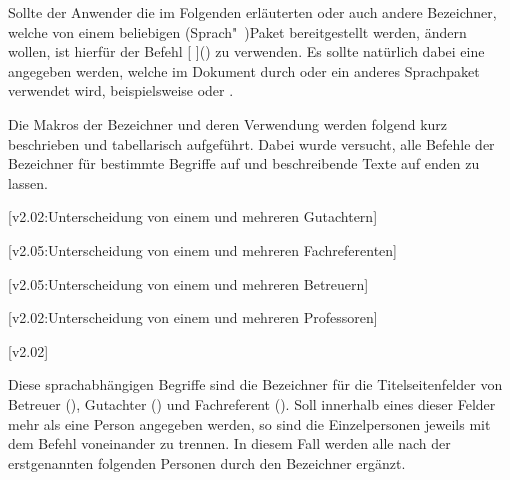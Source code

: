 \begin{DeclareEntity*}{}
\begin{DeclareEntity*}{}
\begin{DeclareEntity*}{}
Sollte der Anwender die im Folgenden erläuterten oder auch andere Bezeichner, 
welche von einem beliebigen (Sprach"~)Paket bereitgestellt werden, ändern 
wollen, ist hierfür der Befehl
[%
]()
zu verwenden. Es sollte natürlich dabei eine  angegeben werden, 
welche im Dokument durch  oder ein anderes Sprachpaket verwendet 
wird, beispielsweise  oder . 

Die Makros der Bezeichner und deren Verwendung werden folgend kurz beschrieben 
und tabellarisch aufgeführt. Dabei wurde versucht, alle Befehle der Bezeichner 
für bestimmte Begriffe auf  und beschreibende Texte auf 
 enden zu lassen.

\begin{Declaration}
  {}
  [v2.02:Unterscheidung von einem und mehreren Gutachtern]
\begin{Declaration}
  {}
\begin{Declaration}
  {}
  [v2.05:Unterscheidung von einem und mehreren Fachreferenten]
\begin{Declaration}
  {}
\begin{Declaration}
  {}
  [v2.05:Unterscheidung von einem und mehreren Betreuern]
\begin{Declaration}
  {}
\begin{Declaration}
  {}
  [v2.02:Unterscheidung von einem und mehreren Professoren]
\begin{Declaration}
  {}
  [v2.02]

Diese sprachabhängigen Begriffe sind die Bezeichner für die Titelseitenfelder 
von Betreuer (), Gutachter () und Fachreferent 
(). Soll innerhalb eines dieser Felder mehr als eine Person 
angegeben werden, so sind die Einzelpersonen jeweils mit dem Befehl  
voneinander zu trennen. In diesem Fall werden alle nach der erstgenannten 
folgenden Personen durch den Bezeichner  ergänzt.


\end{Declaration}
\end{Declaration}
\end{Declaration}
\end{Declaration}
\end{Declaration}
\end{Declaration}
\end{Declaration}
\end{Declaration}
\end{DeclareEntity*}
\end{DeclareEntity*}
\end{DeclareEntity*}
